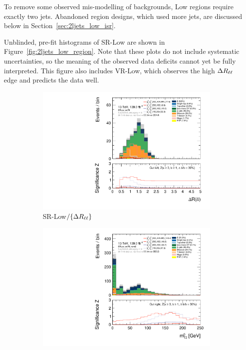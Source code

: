 To remove some observed mis-modelling of backgrounds, Low regions require
exactly two jets.
Abandoned region designs, which used more jets, are discussed below in
Section~\ref{sec:2ljets_low_isr}.

Unblinded, pre-fit histograms of SR-Low are shown in
Figure~\ref{fig:2ljets_low_region}.
Note that these plots do not include systematic uncertainties, so the meaning
of the observed data deficits cannot yet be fully interpreted.
This figure also includes VR-Low, which observes the high $\Delta R_{\ell\ell}$ edge and
predicts the data well.

\begin{figure}[tp]
\centering
\begin{subfigure}{0.495\textwidth}
\centering
\includegraphics[width=\textwidth]{figures/2ljets_low_Rll_SRLow_noRll.pdf}
\caption{SR-Low$/\{\Delta R_{\ell\ell}\}$}
\end{subfigure}
\hfill
\begin{subfigure}{0.495\textwidth}
\centering
\includegraphics[width=\textwidth]{figures/2ljets_low_mt2leplsp_0_SRLow_noRll_nomt2.pdf}

\end{subfigure}
\end{figure}
